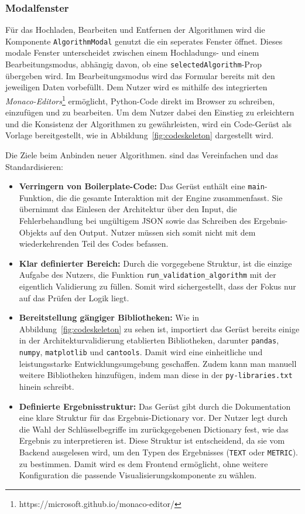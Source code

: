 \subsubsection*{Modalfenster}

Für das Hochladen, Bearbeiten und Entfernen der Algorithmen wird die Komponente \texttt{AlgorithmModal} genutzt die ein seperates Fenster öffnet. Dieses modale Fenster unterscheidet zwischen einem Hochladungs- und einem Bearbeitungsmodus, abhängig davon, ob eine \texttt{selectedAlgorithm}-Prop übergeben wird. Im Bearbeitungsmodus wird das Formular bereits mit den jeweiligen Daten vorbefüllt. Dem Nutzer wird es mithilfe des integrierten \textit{Monaco-Editors}\footnote{https://microsoft.github.io/monaco-editor/} ermöglicht, Python-Code direkt im Browser zu schreiben, einzufügen und zu bearbeiten. Um dem Nutzer dabei den Einstieg zu erleichtern und die Konsistenz der Algorithmen zu gewährleisten, wird ein Code-Gerüst als Vorlage bereitgestellt, wie in Abbildung~\ref{fig:codeskeleton} dargestellt wird.

Die Ziele beim Anbinden neuer Algorithmen. sind das Vereinfachen und das Standardisieren:

\begin{itemize}
  \item \textbf{Verringern von Boilerplate-Code:} Das Gerüst enthält eine \texttt{main}-Funktion, die die gesamte Interaktion mit der Engine zusammenfasst. Sie übernimmt das Einlesen der Architektur über den Input, die Fehlerbehandlung bei ungültigem JSON sowie das Schreiben des Ergebnis-Objekts auf den Output. Nutzer müssen sich somit nicht mit dem wiederkehrenden Teil des Codes befassen.
  \item \textbf{Klar definierter Bereich:} Durch die vorgegebene Struktur, ist die einzige Aufgabe des Nutzers, die Funktion \texttt{run\_validation\_algorithm} mit der eigentlich Validierung zu füllen. Somit wird sichergestellt, dass der Fokus nur auf das Prüfen der Logik liegt.
  \item \textbf{Bereitstellung gängiger Bibliotheken:} Wie in Abbildung~\ref{fig:codeskeleton} zu sehen ist, importiert das Gerüst bereits einige in der Architekturvalidierung etablierten Bibliotheken, darunter \texttt{pandas}, \texttt{numpy}, \texttt{matplotlib} und \texttt{cantools}. Damit wird eine einheitliche und leistungsstarke Entwicklungsumgebung geschaffen. Zudem kann man manuell weitere Bibliotheken hinzufügen, indem man diese in der \texttt{py-libraries.txt} hinein schreibt.
  \item \textbf{Definierte Ergebnisstruktur:} Das Gerüst gibt durch die Dokumentation eine klare Struktur für das Ergebnis-Dictionary vor. Der Nutzer legt durch die Wahl der Schlüsselbegriffe im zurückgegebenen Dictionary fest, wie das Ergebnis zu interpretieren ist. Diese Struktur ist entscheidend, da sie vom Backend ausgelesen wird, um den Typen des Ergebnisses (\texttt{TEXT} oder \texttt{METRIC}). zu bestimmen. Damit wird es dem Frontend ermöglicht, ohne weitere Konfiguration die passende Visualisierungskomponente zu wählen.
\end{itemize}


